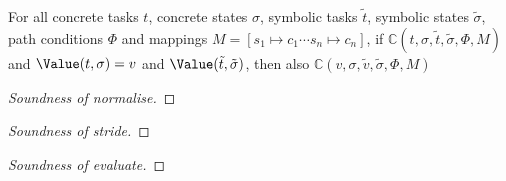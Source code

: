 \begin{lemma}
  \label{lem:valpres}
  For all concrete tasks $t$, concrete states $\sigma$, symbolic tasks $\tilde{t}$, symbolic states $\tilde{\sigma}$, path conditions $\Phi$ and mappings $M=[s_1\mapsto c_1\cdots s_n\mapsto c_n]$,
  if $\mathds{C}(t,\sigma,\tilde{t},\tilde{\sigma},\Phi,M)$ and $\Value(t,\sigma)=v$ and $\Value(\tilde{t},\tilde{\sigma})$,
  then also $\mathds{C}(v,\sigma,\tilde{v},\tilde{\sigma},\Phi,M)$
\end{lemma}

\begin{proof}[Soundness of normalise]

\end{proof}

\begin{proof}[Soundness of stride]

\end{proof}

\begin{proof}[Soundness of evaluate]

\end{proof}
